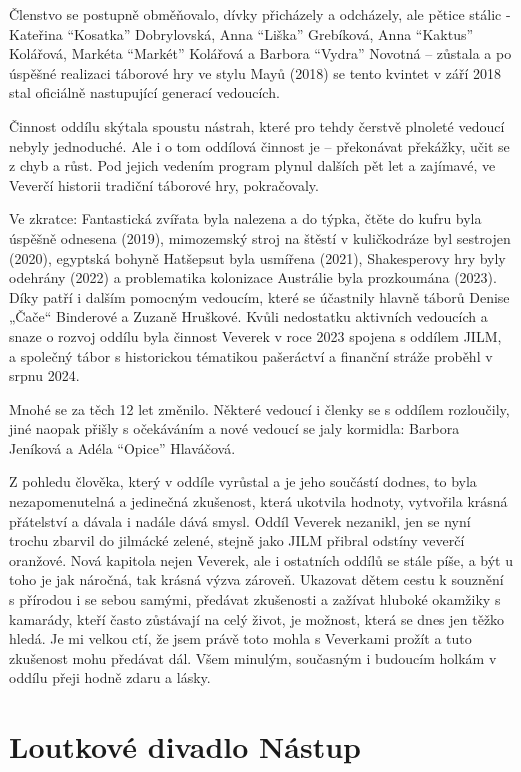 Členstvo se postupně obměňovalo, dívky přicházely a odcházely, ale
pětice stálic - Kateřina ``Kosatka'' Dobrylovská, Anna ``Liška''
Grebíková, Anna ``Kaktus'' Kolářová, Markéta ``Markét'' Kolářová a
Barbora ``Vydra'' Novotná -- zůstala a po úspěšné realizaci táborové hry
ve stylu Mayů (2018) se tento kvintet v září 2018 stal oficiálně
nastupující generací vedoucích.

Činnost oddílu skýtala spoustu nástrah, které pro tehdy čerstvě plnoleté
vedoucí nebyly jednoduché. Ale i o tom oddílová činnost je -- překonávat
překážky, učit se z chyb a růst. Pod jejich vedením program plynul
dalších pět let a zajímavé, ve Veverčí historii tradiční táborové hry,
pokračovaly.

Ve zkratce: Fantastická zvířata byla nalezena a do týpka, čtěte do kufru
byla úspěšně odnesena (2019), mimozemský stroj na štěstí v kuličkodráze
byl sestrojen (2020), egyptská bohyně Hatšepsut byla usmířena (2021),
Shakesperovy hry byly odehrány (2022) a problematika kolonizace
Austrálie byla prozkoumána (2023). Díky patří i dalším pomocným
vedoucím, které se účastnily hlavně táborů Denise „Čače`` Binderové a
Zuzaně Hruškové. Kvůli nedostatku aktivních vedoucích a snaze o rozvoj
oddílu byla činnost Veverek v roce 2023 spojena s oddílem JILM, a
společný tábor s historickou tématikou pašeráctví a finanční stráže
proběhl v srpnu 2024.

Mnohé se za těch 12 let změnilo. Některé vedoucí i členky se s oddílem
rozloučily, jiné naopak přišly s očekáváním a nové vedoucí se jaly
kormidla: Barbora Jeníková a Adéla ``Opice'' Hlaváčová.

Z pohledu člověka, který v oddíle vyrůstal a je jeho součástí dodnes, to
byla nezapomenutelná a jedinečná zkušenost, která ukotvila hodnoty,
vytvořila krásná přátelství a dávala i nadále dává smysl. Oddíl Veverek
nezanikl, jen se nyní trochu zbarvil do jilmácké zelené, stejně jako
JILM přibral odstíny veverčí oranžové. Nová kapitola nejen Veverek, ale
i ostatních oddílů se stále píše, a být u toho je jak náročná, tak
krásná výzva zároveň. Ukazovat dětem cestu k souznění s přírodou i se
sebou samými, předávat zkušenosti a zažívat hluboké okamžiky s kamarády,
kteří často zůstávají na celý život, je možnost, která se dnes jen těžko
hledá. Je mi velkou ctí, že jsem právě toto mohla s Veverkami prožít a
tuto zkušenost mohu předávat dál. Všem minulým, současným i budoucím
holkám v oddílu přeji hodně zdaru a lásky.

\section{Loutkové divadlo Nástup}\label{loutkovuxe9-divadlo-nuxe1stup}

